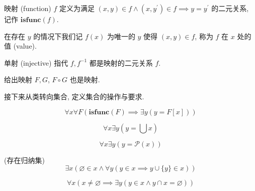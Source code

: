 \begin{definition}
    \label {definition:function (set)}
    映射 (function) \(f\) 定义为满足 \((x,y) \in f \land (x,y^\prime) \in f \implies y = y^\prime\) 的二元关系, 记作 \(\mathbf{isfunc} (f)\).

    在存在 \(y\) 的情况下我们记 \(f(x)\) 为唯一的 \(y\) 使得 \((x,y) \in f\), 称为 \(f\) 在 \(x\) 处的值 (value).
\end{definition}

\begin{definition}
    \label {definition:injective (set)}
    单射 (injective) 指代 \(f, f^{-1}\) 都是映射的二元关系 \(f\).
\end{definition}

\begin{corollary}
    给出映射 \(F, G\), \(F \circ G\) 也是映射.
\end{corollary}

接下来从类转向集合, 定义集合的操作与要求.

\begin{axiom}
    \label {axiom:NBG Axiom of Replacement}
    \[
        \forall x \forall F (\mathbf{isfunc} (F) \implies \exists y (y = F[x]))
    \]
\end{axiom}

\begin{axiom}
    \label {axiom:NBG Axiom of Union}
    \[
        \forall x \exists y (y = \bigcup x)
    \]
\end{axiom}

\begin{axiom}
    \label {axiom:NBG Axiom of Power Set}
    \[
        \forall x \exists y (y = \mathcal{P} (x))
    \]
\end{axiom}

\begin{axiom}
    \label {axiom:NBG Axiom of Infinity} (存在归纳集)
    \[
        \exists x (\varnothing \in x \land \forall y (y \in x \implies y \cup \{y\} \in x))
    \]
\end{axiom}

\begin{axiom}
    \label {axiom:NBG Axiom of Foundation}
    \[
        \forall x (x \neq \varnothing \implies \exists y (y \in x \land y \cap x = \varnothing))
    \]
\end{axiom}

